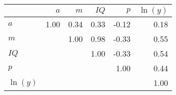 \begin{tabular}{lrrrrr}
\hline
 & $a$  & $m$  & $IQ$  & $p$  & $\ln(y)$  \\
\hline
$a$ & 1.00  & 0.34  & 0.33  & -0.12  & 0.18  \\
$m$ &   & 1.00  & 0.98  & -0.33  & 0.55  \\
$IQ$ &   &   & 1.00  & -0.33  & 0.54  \\
$p$ &   &   &   & 1.00  & 0.44  \\
$\ln(y)$ &   &   &   &   & 1.00  \\
\hline
\end{tabular}%
